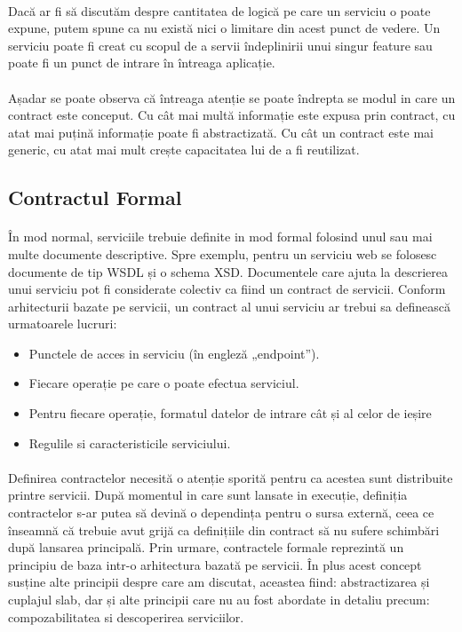 \documentclass[12pt]{report}
\begin{document}
  	\paragraph{}Dacă ar fi să discutăm despre cantitatea de logică pe care un serviciu o poate expune, putem spune ca nu există nici o limitare din acest punct de vedere. Un serviciu poate fi creat cu scopul de a servii îndeplinirii unui singur feature sau poate fi un punct de intrare în întreaga aplicație.
  	\paragraph{}Așadar se poate observa că întreaga atenție se poate îndrepta se modul in care un contract este conceput. Cu cât mai multă informație este expusa prin contract, cu atat mai puțină informație poate fi abstractizată. Cu cât un contract este mai generic, cu atat mai mult crește capacitatea lui de a fi reutilizat.
  	\subsection{Contractul Formal}
  	\paragraph{}În mod normal, serviciile trebuie definite in mod formal folosind unul sau mai multe documente descriptive. Spre exemplu, pentru un serviciu web se folosesc documente de tip WSDL și o schema XSD. Documentele care ajuta la descrierea unui serviciu pot fi considerate colectiv ca fiind un contract de servicii. Conform arhitecturii bazate pe servicii, un contract al unui serviciu ar trebui sa definească urmatoarele lucruri:
  	\begin{itemize}
  	\item Punctele de acces in serviciu (în engleză „endpoint”).
  	\item Fiecare operație pe care o poate efectua serviciul.
  	\item Pentru fiecare operație, formatul datelor de intrare cât și al celor de ieșire
  	\item Regulile si caracteristicile serviciului.
  	\end{itemize}
  	\paragraph{}Definirea contractelor necesită o atenție sporită pentru ca acestea sunt distribuite printre servicii. După momentul in care sunt lansate in execuție, definiția contractelor s-ar putea să devină o dependința pentru o sursa externă, ceea ce înseamnă că trebuie avut grijă ca definițiile din contract să nu sufere schimbări după lansarea principală. Prin urmare, contractele formale reprezintă un principiu de baza intr-o arhitectura bazată pe servicii. În plus acest concept susține alte principii despre care am discutat, aceastea fiind: abstractizarea și cuplajul slab, dar și alte principii care nu au fost abordate in detaliu precum: compozabilitatea si descoperirea serviciilor.
\end{document}

